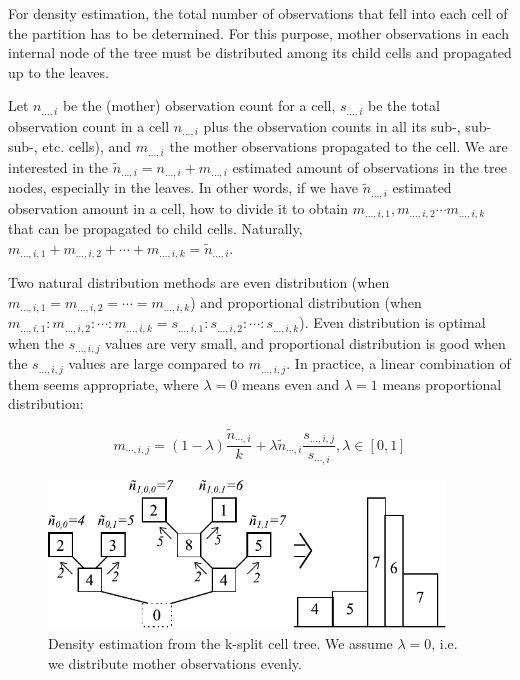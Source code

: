 For density estimation, the total number of observations that
fell into each cell of the partition has to be determined. For
this purpose, mother observations in each internal node of the
tree must be distributed among its child cells and propagated
up to the leaves.


Let $n_{...,i}$ be the (mother) observation count for a cell,
$s_{...,i}$ be the total observation count in a cell $n_{...,i}$ plus
the observation counts in all its sub-, sub-sub-, etc. cells), and
$m_{...,i}$ the mother observations propagated to the cell. We are
interested in the $\tilde{n}_{...,i} = n_{...,i} + m_{...,i}$
estimated amount of observations in the tree nodes, especially in the
leaves. In other words, if we have $\tilde{n}_{...,i}$ estimated
observation amount in a cell, how to divide it to obtain $m_{...,i,1},
m_{...,i,2} \cdots m_{...,i,k}$ that can be propagated to child cells.
Naturally, $m_{...,i,1} + m_{...,i,2} + \cdots + m_{...,i,k} =
\tilde{n}_{...,i}$.


Two natural distribution methods are even
distribution (when $m_{...,i,1} = m_{...,i,2}
= \cdots = m_{...,i,k}$) and proportional
distribution (when $m_{...,i,1} :
m_{...,i,2} : \cdots : m_{...,i,k} = s_{...,i,1} : s_{...,i,2} :
\cdots : s_{...,i,k}$). Even distribution is optimal when the
$s_{...,i,j}$ values are very small, and proportional distribution is
good when the $s_{...,i,j}$ values are large compared to
$m_{...,i,j}$. In practice, a linear combination of them seems
appropriate, where $\lambda=0$ means even and $\lambda=1$ means
proportional distribution:


\begin{equation}
m_{\cdots,i,j}=(1-\lambda )\frac{\tilde{n}_{\cdots,i}}{k} + \lambda \tilde{n}_{\cdots,i} \frac{s_{...,i,j}}{s_{\cdots,i}}, {\lambda}\in[0,1]
\end{equation}

\begin{figure}[htbp]
  \begin{center}
    \includegraphics[width=4.147in, height=1.567in]{figures/usmanFig16}
    \caption{Density estimation from the k-split cell tree. We
      assume $\lambda=0$, i.e. we distribute mother observations
      evenly.}
  \end{center}
\end{figure}

